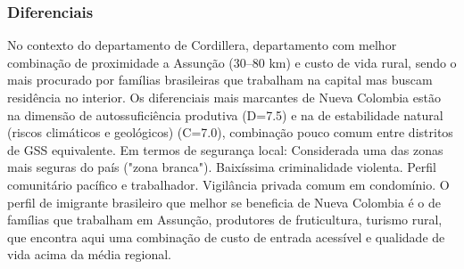 \subsubsection*{Diferenciais}\label{dif-nueva-colombia-0313}
No contexto do departamento de Cordillera, departamento com melhor combinação de proximidade a Assunção (30–80 km) e custo de vida rural, sendo o mais procurado por famílias brasileiras que trabalham na capital mas buscam residência no interior. Os diferenciais mais marcantes de Nueva Colombia estão na dimensão de autossuficiência produtiva (D=7.5) e na de estabilidade natural (riscos climáticos e geológicos) (C=7.0), combinação pouco comum entre distritos de GSS equivalente. Em termos de segurança local: Considerada uma das zonas mais seguras do país ("zona branca"). Baixíssima criminalidade violenta. Perfil comunitário pacífico e trabalhador. Vigilância privada comum em condomínio. O perfil de imigrante brasileiro que melhor se beneficia de Nueva Colombia é o de famílias que trabalham em Assunção, produtores de fruticultura, turismo rural, que encontra aqui uma combinação de custo de entrada acessível e qualidade de vida acima da média regional.
